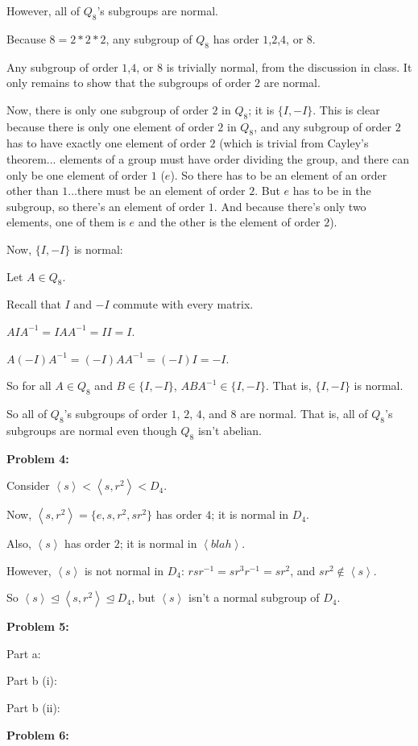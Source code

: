 \documentclass[a4paper,12pt]{article}
\newcommand{\shunt}{\vspace{20mm}}
\newcommand{\anbrack}[1]{\left\langle #1 \right\rangle}
\newcommand{\subgp}{\mathrel{\unlhd}}
\begin{document}
However, all of $Q_8$'s subgroups are normal.

Because $8 = 2*2*2$, any subgroup of $Q_8$ has order $1$,$2$,$4$, or $8$.

Any subgroup of order $1$,$4$, or $8$ is trivially normal, from the discussion in class. It only remains to show that the subgroups of order $2$ are normal.

Now, there is only one subgroup of order $2$ in $Q_8$; it is $\{I, -I\}$. This is clear because there is only one element of order $2$ in $Q_8$, and any subgroup of order $2$ has to have exactly one element of order $2$ (which is trivial from Cayley's theorem... elements of a group must have order dividing the group, and there can only be one element of order $1$ ($e$). So there has to be an element of an order other than $1$...there must be an element of order $2$. But $e$ has to be in the subgroup, so there's an element of order $1$. And because there's only two elements, one of them is $e$ and the other is the element of order $2$).

Now, $\{I, -I\}$ is normal:

Let $A \in Q_8$.

Recall that $I$ and $-I$ commute with every matrix.

$AIA^{-1} = IAA^{-1} = II=I$.

$A(-I)A^{-1} = (-I)AA^{-1} = (-I)I=-I$.

So for all $A \in Q_8$ and $B \in \{I, -I\}$, $ABA^{-1} \in \{I, -I\}$. That is, $\{I, -I\}$ is normal.

So all of $Q_8$'s subgroups of order $1$, $2$, $4$, and $8$ are normal. That is, all of $Q_8$'s subgroups are normal even though $Q_8$ isn't abelian.

\shunt

{\bf Problem 4:}

Consider $\anbrack{s} < \anbrack{s,r^2} < D_4$.

Now, $\anbrack{s,r^2} = \{e,s,r^2,sr^2\}$ has order $4$; it is normal in $D_4$.

Also, $\anbrack{s}$ has order $2$; it is normal in $\anbrack{blah}$.

However, $\anbrack{s}$ is not normal in $D_4$: $rsr^{-1} = sr^3r^{-1}=sr^2$, and $sr^2 \notin \anbrack{s}$.

So $\anbrack{s} \subgp \anbrack{s,r^2} \subgp D_4$, but $\anbrack{s}$ isn't a normal subgroup of $D_4$.

\shunt

{\bf Problem 5:}

Part a:

\shunt

Part b (i):

\shunt

Part b (ii):

\shunt

{\bf Problem 6:}

\shunt
\end{document}
